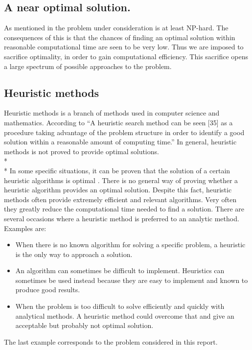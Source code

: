 \subsection{A near optimal solution.}
As mentioned in \cite{paper1} the problem under consideration is at least NP-hard. The consequences of this is that the chances of finding an optimal solution within reasonable computational time are seen to be very low. Thus we are imposed to sacrifice optimality, in order to gain computational efficiency. This sacrifice opens a large spectrum of possible approaches to the problem.
\subsection{Heuristic methods}
Heuristic methods is a branch of methods used in computer science and mathematics. According to \cite{heuristics} ``A heuristic search method can be seen [35] as a procedure taking advantage of the problem structure in order to identify a good solution within a reasonable amount of computing time.''
In general, heuristic methods is not proved to provide optimal solutions.\\*%
\\*
In some specific situations, it can be proven that the solution of a certain heuristic algorithms is optimal%
. There is no general way of proving whether a heuristic algorithm provides an optimal solution. Despite this fact, heuristic methods often provide extremely efficient and relevant algorithms. Very often they greatly reduce the computational time needed to find a solution. There are several occasions where a heuristic method is preferred to an analytic method. Examples are:
\begin{itemize}
\item When there is no known algorithm for solving a specific problem, a heuristic is the only way to approach a solution.
\item An algorithm can sometimes be difficult to implement. Heuristics can sometimes be used instead because they are easy to implement and known to produce good results.
\item When the problem is too difficult to solve efficiently and quickly with analytical methods. A heuristic method could overcome that and give an acceptable but probably not optimal solution.
\end{itemize}

The last example corresponds to the problem considered in this report.

